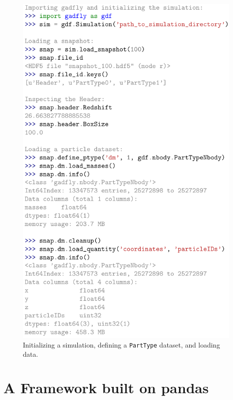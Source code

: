 \documentclass{emulateapj}
\newcommand{\code}[1]{\texttt{#1}}
\begin{document}
\begin{figure}[h!]
\begin{center}
\includegraphics[width=0.98\columnwidth]{figures/code_usage/code_usage}
\caption{\label{fig:usage_example}
Initializing a simulation, defining a \code{PartType} dataset, and loading data.%
}
\end{center}
\end{figure}

\section{A Framework built on pandas}
\label{sec:framework}
\end{document}
